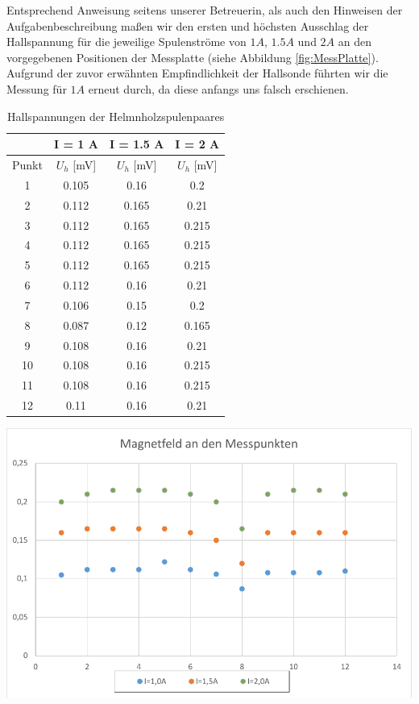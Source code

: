 Entsprechend Anweisung seitens unserer Betreuerin, als auch den Hinweisen der Aufgabenbeschreibung maßen wir den ersten und höchsten Ausschlag der Hallspannung für die jeweilige Spulenströme von $1 A$, $1.5 A$ und $2 A$ an den vorgegebenen Positionen der Messplatte (siehe Abbildung \ref{fig:MessPlatte}). Aufgrund der zuvor erwähnten  Empfindlichkeit der  Hallsonde führten wir die Messung für $1 A$ erneut durch, da diese anfangs uns falsch erschienen.


\newpage
 

\begin{table}
\begin{center}
\begin{tabular}{|c|c|c|c|}
\hline 
& I = 1 A & I = 1.5 A & I = 2 A \\ 
\hline 
Punkt & $U_h$ [mV] & $U_h$ [mV] & $U_h$ [mV] \\ 
\hline 
1 & 0.105 & 0.16 & 0.2 \\ 
\hline 
2 & 0.112 & 0.165 & 0.21 \\ 
\hline 
3 & 0.112 & 0.165 & 0.215 \\ 
\hline 
4 & 0.112 & 0.165 & 0.215 \\ 
\hline 
5 & 0.112 & 0.165 & 0.215 \\ 
\hline 
6 & 0.112 & 0.16 & 0.21 \\ 
\hline 
7 & 0.106 & 0.15 & 0.2 \\ 
\hline 
8 & 0.087 & 0.12 & 0.165 \\ 
\hline 
9 & 0.108 & 0.16 & 0.21 \\ 
\hline 
10 & 0.108 & 0.16 & 0.215 \\ 
\hline 
11 & 0.108 & 0.16 & 0.215 \\ 
\hline 
12 & 0.11 & 0.16 & 0.21 \\ 
\hline 
\end{tabular} 
\caption{Hallspannungen der Helmnholzspulenpaares}
\end{center}
\end{table}

\begin{center}                                       
  \includegraphics{./include/Bfeld.pdf} 
                          
\end{center} 

